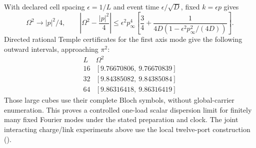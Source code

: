 With declared cell spacing $\epsilon=1/L$ and event time
$\epsilon/\sqrt D$, fixed $k=\epsilon p$ gives
\[
 \Omega^2\longrightarrow |p|^2/4,
 \qquad
 \left|\Omega^2-\frac{|p|^2}{4}\right|
 \le\epsilon^2p_\infty^4
 \left[\frac34+\frac{1}{4D(1-\epsilon^2p_\infty^2/(4D))}\right].
\]
Directed rational Temple certificates for the first axis mode give the
following outward intervals, approaching $\pi^2$:
\[
\begin{array}{c|c}
 L&\Omega^2\\\hline
 16&[9.76670806,\ 9.76670839]\\
 32&[9.84385082,\ 9.84385084]\\
 64&[9.86316418,\ 9.86316419]
\end{array}
\]
Those large cubes use their complete Bloch symbols, without global-carrier
enumeration. This proves a controlled one-load scalar dispersion limit for
finitely many fixed Fourier modes under the stated preparation and clock.
The joint interacting charge/link experiments above use the local
twelve-port construction ().
